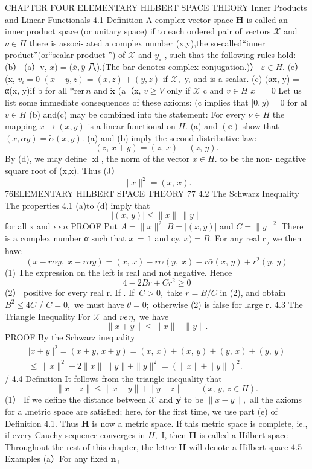 CHAPTER FOUR ELEMENTARY HILBERT SPACE THEORY Inner Products and Linear Functionals 4.1 Definition A complex vector space ${\boldsymbol{H}}$ is called an inner product space (or unitary space) if to each ordered pair of vectors $\scriptstyle{\mathcal{X}}$ and $\nu\in H$ there is associ- ated a complex number (x,y),the so-called“inner product”(or“scalar product ”) of $\scriptstyle{\mathcal{X}}$ and $y_{\circ}$ , such that the following rules hold: (b） (a）v, $x)=({\overline{{x}}},{\overline{{y}}}$ 八).(The bar denotes complex conjugation.)） $\varepsilon\in H.$ (e）(x, $\scriptstyle v_{i}=0$ $(x+y,z)=(x,z)+(y,z)$ if ${\mathcal{X}},$ y, and is a scalar. (c) (αx, y) = α(x, y)if b for all $\mathrm{*{rer}}\,n$ and $\scriptstyle{\dot{\mathbf{x}}}$ (a（x, $\scriptstyle v\geq V$ only if $\scriptstyle{\mathcal{X}}$ c and $\textstyle v\in H$ $\scriptstyle x\;=\;0$ Let us list some immediate consequences of these axioms: (c implies that $[0,y)=0$ for al $\textstyle v\in H$ (b) and(c) may be combined into the statement: For every $\nu\in H$ the mapping $x\to(x,y)$ is a linear functional on $\textstyle H.$ (a) and $\mathbf{(c)}$ show that $(x,\alpha y)={\tilde{\alpha}}(x,y).$ (a) and (b) imply the second distributive law: $$ (z,\,x+y)=(z,\,x)+(z,\,y). $$ By (d), we may define |xl|, the norm of the vector $x\in H.$ to be the non- negative square root of (x,x). Thus (J） $$ \|x\|^{2}=(x,\,x). $$ 76ELEMENTARY HILBERT SPACE THEORY 77 4.2 The Schwarz Inequality The properties 4.1 (a)to (d) imply that $$ |(x,\,y)|\leq\|x\|\ \|y\| $$ for all x and $\textstyle{\epsilon\,\epsilon\,n}$ PROOF Put $A=\|x\|^{2}$ $B=|(x,y)|$ and $C=\|y\|^{2}$ There is a complex number α such that $\scriptstyle x\,=\,1$ and cy, $x)=B.$ For any real ${\boldsymbol{r}}_{\!_{J}}$ we then have $$ (x-r\alpha y,\;x-r\alpha y)=(x,\,x)-r\alpha(y,\;x)-r\bar{\alpha}(x,\,y)+r^{2}(y,\,y) $$ (1) The expression on the left is real and not negative. Hence $$ 4-2B r+C r^{2}\geq0 $$ (2） positive for every real r. If . If $\ C>0,$ take $r=B/C$ in (2), and obtain $B^{2}\leq4C$ / $\scriptstyle C=0,$ we must have $\theta=0;$ otherwise (2) is false for large ${\boldsymbol{r}}.$ 4.3 The Triangle Inequality For $\scriptstyle{\mathcal{X}}$ and $\nu\epsilon\,\eta,$ we have $$ \|x+y\|\leq\|x\|+\|y\|. $$ PROOF By the Schwarz inequality $$ \begin{array}{c}{{|x+y||^{2}=(x+y,\,x+y)=(x,\,x)+(x,\,y)+(y,\,x)+(y,\,y)}}\\ {{\leq\,\|x\|^{2}+2\|x\|\,\|y\|+\|y\|^{2}=(\|x\|+\|y\|)^{2}.}}\end{array} $$ / 4.4 Definition It follows from the triangle inequality that $$ \|x-z\|\leq\|x-y\|+\|y-z\|\quad\quad(x,\,y,\,z\in H). $$ (1） If we define the distance between $\scriptstyle{\mathcal{X}}$ and $\mathbf{\vec{y}}$ to be $\|x-y\|,$ all the axioms for a .metric space are satisfied; here, for the first time, we use part (e) of Definition 4.1. Thus ${\boldsymbol{H}}$ is now a metric space. If this metric space is complete, ie., if every Cauchy sequence converges in $\textstyle H,$ I, then ${\boldsymbol{H}}$ is called a Hilbert space Throughout the rest of this chapter, the letter ${\boldsymbol{H}}$ will denote a Hilbert space 4.5 Examples (a）For any fixed ${\boldsymbol{n}}_{\mathsf{J}}$ 